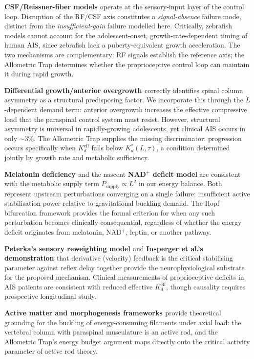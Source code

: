 \documentclass[12pt, letterpaper]{article}
\newcommand{\Kdcrit}{K_d^{*}}
\newcommand{\Kdeff}{K_d^{\mathrm{eff}}}
\begin{document}
\textbf{CSF/Reissner-fiber models \citep{CantautBelarif2018, Troutwine2020,
Sternberg2018}} operate at the sensory-input layer of the control loop. Disruption
of the RF/CSF axis constitutes a \emph{signal-absence} failure mode, distinct
from the \emph{insufficient-gain} failure modelled here. Critically, zebrafish
models cannot account for the adolescent-onset, growth-rate-dependent timing of
human AIS, since zebrafish lack a puberty-equivalent growth acceleration.
The two mechanisms are complementary: RF signals establish the reference axis;
the Allometric Trap determines whether the proprioceptive control loop can
maintain it during rapid growth.

\textbf{Differential growth/anterior overgrowth \citep{Castelein2005}} correctly
identifies spinal column asymmetry as a structural predisposing factor.
We incorporate this through the $\dot{L}$-dependent demand term: anterior
overgrowth increases the effective compressive load that the paraspinal control
system must resist. However, structural asymmetry is universal in rapidly-growing
adolescents, yet clinical AIS occurs in only $\sim 3\%$. The Allometric Trap
supplies the missing discriminator: progression occurs specifically when
$\Kdeff$ falls below $\Kdcrit(L, \tau)$, a condition determined jointly by
growth rate and metabolic sufficiency.

\textbf{Melatonin deficiency \citep{Machida1993}} and the nascent \textbf{NAD$^{+}$
deficit model} are consistent with the metabolic supply term
$P_{\mathrm{supply}} \propto L^{2}$ in our energy balance. Both represent upstream
perturbations converging on a single failure: insufficient active stabilisation
power relative to gravitational buckling demand. The Hopf bifurcation framework
provides the formal criterion for when any such perturbation becomes clinically
consequential, regardless of whether the energy deficit originates from melatonin,
NAD$^{+}$, leptin, or another pathway.

\textbf{Peterka's sensory reweighting model \citep{Peterka2002}} and
\textbf{Insperger et al.'s demonstration \citep{Insperger2013}} that derivative
(velocity) feedback is the critical stabilising parameter against reflex delay
together provide the neurophysiological substrate for the proposed mechanism.
Clinical measurements of proprioceptive deficits in AIS patients
\citep{Chow2006, Mallau2007} are consistent with reduced effective $\Kdeff$,
though causality requires prospective longitudinal study.

\textbf{Active matter and morphogenesis frameworks \citep{Marchetti2013}} provide
theoretical grounding for the buckling of energy-consuming filaments under axial
load: the vertebral column with paraspinal musculature is an active rod, and
the Allometric Trap's energy budget argument maps directly onto the critical
activity parameter of active rod theory.
\end{document}
